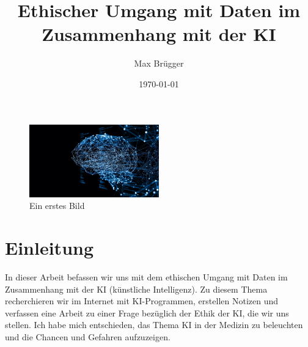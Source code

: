 \documentclass{article}
\title{Ethischer Umgang mit Daten im Zusammenhang mit der KI}
\author{Max Brügger}
\date{\today}
\begin{document}
\maketitle

\begin{figure}[h]
    \centering
    \includegraphics[width=0.5\textwidth]{brain.png}
    \caption{Ein erstes Bild}
\end{figure}

\clearpage

\tableofcontents

\clearpage


\section{Einleitung}
In dieser Arbeit befassen wir uns mit dem ethischen Umgang mit Daten im Zusammenhang mit der KI (künstliche Intelligenz). Zu diesem Thema  recherchieren wir im Internet mit KI-Programmen, erstellen Notizen und verfassen eine Arbeit zu einer Frage bezüglich der Ethik der KI, die wir uns stellen. Ich habe mich entschieden, das Thema KI in der Medizin zu beleuchten und die Chancen und Gefahren aufzuzeigen.
\end{document}
